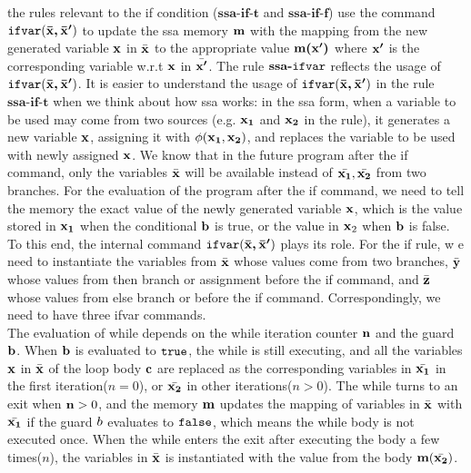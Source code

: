 {{the rules relevant to the if condition ($\textbf{ssa-if-t}$ and $\textbf{ssa-if-f}$) use the command $\mathtt{ifvar}({\boldsymbol{\mathbf{\bar{x}, \bar{x}'}}})$ to update the ssa memory ${\boldsymbol{\mathbf{m}}}$ with the mapping from the new generated variable ${\boldsymbol{\mathbf{x}}}$ in $\bar{{\boldsymbol{\mathbf{x}}}}$ to the appropriate value ${\boldsymbol{\mathbf{m(x')}}}$ where ${\boldsymbol{\mathbf{x'}}}$ is the corresponding variable w.r.t ${\boldsymbol{\mathbf{x}}}$ in $\bar{{\boldsymbol{\mathbf{x'}}}}$.
%
The rule $\textbf{ssa-\ensuremath{\mathtt{ifvar}}}$ reflects the usage of $\mathtt{ifvar}({\boldsymbol{\mathbf{\bar{x}, \bar{x}'}}})$.
%
It is easier to understand the usage of $\mathtt{ifvar}({\boldsymbol{\mathbf{\bar{x}, \bar{x}'}}})$ in the rule $\textbf{ssa-if-t}$ when we think about how ssa works: 
in the ssa form, when a variable to be used may come from two sources (e.g. ${\boldsymbol{\mathbf{x_1}}}$ and ${\boldsymbol{\mathbf{x_2}}}$ in the rule), it generates a new variable ${\boldsymbol{\mathbf{x}}}$, assigning it with $\phi({\boldsymbol{\mathbf{x_1}}}, {\boldsymbol{\mathbf{x_2}}})$,  and replaces the variable to be used with newly assigned ${\boldsymbol{\mathbf{x}}}$. 
We know that in the future program after the if command, 
only the variables $\bar{{\boldsymbol{\mathbf{x}}}}$ will be available instead of $\bar{{\boldsymbol{\mathbf{x_1}}}}, \bar{{\boldsymbol{\mathbf{x_2}}}}$ from two branches.
For the evaluation of the program after the if command, we need to tell the memory the exact value of the newly generated variable ${\boldsymbol{\mathbf{x}}}$, which is the value stored in ${\boldsymbol{\mathbf{x_1}}}$ when the conditional ${\boldsymbol{\mathbf{b}}}$ is true, 
or the value in ${\boldsymbol{\mathbf{x}}}_2$ when ${\boldsymbol{\mathbf{b}}}$ is false. To this end, the internal command $\mathtt{ifvar}({\boldsymbol{\mathbf{\bar{x}, \bar{x}'}}})$ plays its role. 
For the if rule, w
e need to instantiate the variables from $\bar{{\boldsymbol{\mathbf{x}}}}$ whose values come from two branches, 
$\bar{{\boldsymbol{\mathbf{y}}}}$ whose values from then branch or assignment before the if command, and $\bar{{\boldsymbol{\mathbf{z}}}}$ whose values from else branch or before the if command. 
Correspondingly, we need to have three ifvar commands.   
}
\\
  The evaluation of while depends on the while iteration counter ${\boldsymbol{\mathbf{n}}}$ and the guard ${\boldsymbol{\mathbf{b}}}$. 
  When ${\boldsymbol{\mathbf{b}}}$ is evaluated to $\mathtt{true}$, the while is still executing, and all the variables ${\boldsymbol{\mathbf{x}}}$ in $\bar{{\boldsymbol{\mathbf{x}}}}$ of the loop body ${\boldsymbol{\mathbf{c}}}$ are replaced as the corresponding variables in $\bar{{\boldsymbol{\mathbf{x_1}}}}$ in the first iteration($n=0$), or $\bar{{\boldsymbol{\mathbf{x_2}}}}$ in other iterations($n > 0$). 
  The while turns to an exit when ${\boldsymbol{\mathbf{n}}} > 0$, 
  and the memory ${\boldsymbol{\mathbf{m}}}$ updates the mapping of variables in $\bar{{\boldsymbol{\mathbf{x}}}}$ with $\bar{{\boldsymbol{\mathbf{x_1}}}}$ if the guard $b$ evaluates to $\mathtt{false}$, 
  which means the while body is not executed once. 
  When the while enters the exit after executing the body a few times($n$), the variables in $\bar{{\boldsymbol{\mathbf{x}}}}$ is instantiated with the value from the body ${\boldsymbol{\mathbf{m}}}(\bar{{\boldsymbol{\mathbf{x_2}}}})$. 
%
%
}

